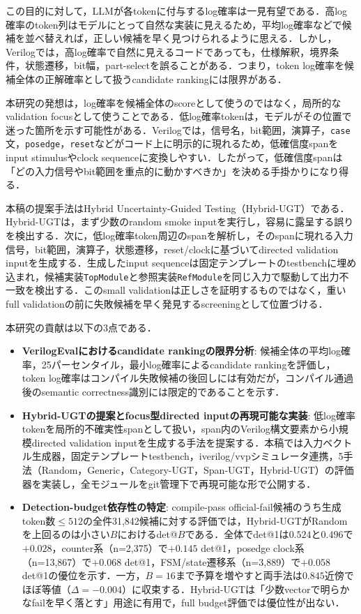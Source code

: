 \documentclass[submit,techrep,noauthor]{ipsj}
\begin{document}
この目的に対して，LLMが各tokenに付与するlog確率は一見有望である．高log確率のtoken列はモデルにとって自然な実装に見えるため，平均log確率などで候補を並べ替えれば，正しい候補を早く見つけられるように思える．しかし，Verilogでは，高log確率で自然に見えるコードであっても，仕様解釈，境界条件，状態遷移，bit幅，part-selectを誤ることがある．つまり，token log確率を候補全体の正解確率として扱うcandidate rankingには限界がある．

本研究の発想は，log確率を候補全体のscoreとして使うのではなく，局所的なvalidation focusとして使うことである．低log確率tokenは，モデルがその位置で迷った箇所を示す可能性がある．Verilogでは，信号名，bit範囲，演算子，\texttt{case}文，\texttt{posedge}，\texttt{reset}などがコード上に明示的に現れるため，低確信度spanをinput stimulusやclock sequenceに変換しやすい．したがって，低確信度spanは「どの入力信号やbit範囲を重点的に動かすべきか」を決める手掛かりになり得る．

本稿の提案手法はHybrid Uncertainty-Guided Testing（Hybrid-UGT）である．Hybrid-UGTは，まず少数のrandom smoke inputを実行し，容易に露呈する誤りを検出する．次に，低log確率token周辺のspanを解析し，そのspanに現れる入力信号，bit範囲，演算子，状態遷移，reset/clockに基づいてdirected validation inputを生成する．生成したinput sequenceは固定テンプレートのtestbenchに埋め込まれ，候補実装\texttt{TopModule}と参照実装\texttt{RefModule}を同じ入力で駆動して出力不一致を検出する．このsmall validationは正しさを証明するものではなく，重いfull validationの前に失敗候補を早く発見するscreeningとして位置づける．

本研究の貢献は以下の3点である．
\begin{itemize}
\item \textbf{VerilogEvalにおけるcandidate rankingの限界分析}: 候補全体の平均log確率，25パーセンタイル，最小log確率によるcandidate rankingを評価し，token log確率はコンパイル失敗候補の後回しには有効だが，コンパイル通過後のsemantic correctness識別には限定的であることを示す．
\item \textbf{Hybrid-UGTの提案とfocus型directed inputの再現可能な実装}: 低log確率tokenを局所的不確実性spanとして扱い，span内のVerilog構文要素から小規模directed validation inputを生成する手法を提案する．本稿では入力ベクトル生成器，固定テンプレートtestbench，iverilog/vvpシミュレータ連携，5手法（Random，Generic，Category-UGT，Span-UGT，Hybrid-UGT）の評価器を実装し，全モジュールをgit管理下で再現可能な形で公開する．
\item \textbf{Detection-budget依存性の特定}: compile-pass official-fail候補のうち生成token数$\le 512$の全件31,842候補に対する評価では，Hybrid-UGTがRandomを上回るのは小さい$B$におけるdet@$B$である．全体でdet@1は$0.524$と$0.496$で$+0.028$，counter系（n=2,375）で$+0.145$ det@1，posedge clock系（n=13,867）で$+0.068$ det@1，FSM/state遷移系（n=3,889）で$+0.058$ det@1の優位を示す．一方，$B=16$まで予算を増やすと両手法は$0.845$近傍でほぼ等値（$\Delta = -0.004$）に収束する．Hybrid-UGTは「少数vectorで明らかなfailを早く落とす」用途に有用で，full budget評価では優位性が出ない．
\end{itemize}
\end{document}

